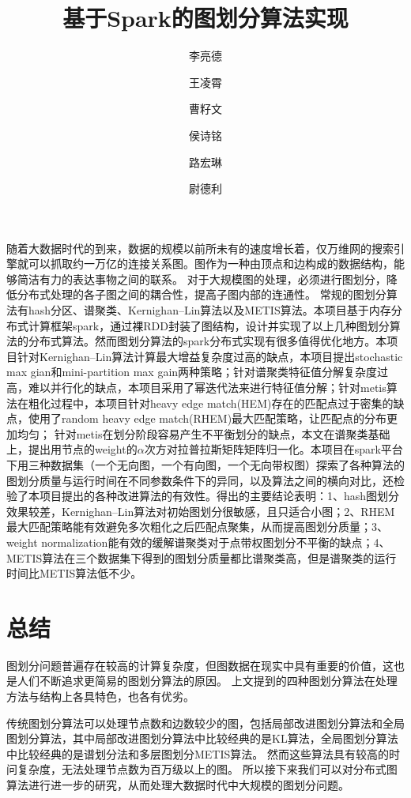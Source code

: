 \documentclass[UTF8,12pt]{ctexart} %
\theoremstyle{definition}
\begin{document}
\title{基于Spark的图划分算法实现}
\author[1]{李亮德}
\author[1]{王凌霄}
\author[2]{曹籽文}
\author[2]{侯诗铭}
\author[2]{路宏琳}
\author[3]{尉德利}
\renewcommand\Authands{, }

\maketitle

\renewcommand{\abstractname}{}
\begin{onecolabstract}
    随着大数据时代的到来，数据的规模以前所未有的速度增长着，仅万维网的搜索引擎就可以抓取约一万亿的连接关系图。图作为一种由顶点和边构成的数据结构，能够简洁有力的表达事物之间的联系。
    对于大规模图的处理，必须进行图划分，降低分布式处理的各子图之间的耦合性，提高子图内部的连通性。
    常规的图划分算法有hash分区、谱聚类、Kernighan–Lin算法以及METIS算法。本项目基于内存分布式计算框架spark，通过裸RDD封装了图结构，设计并实现了以上几种图划分算法的分布式算法。然而图划分算法的spark分布式实现有很多值得优化地方。本项目针对Kernighan–Lin算法计算最大增益复杂度过高的缺点，本项目提出stochastic max gian和mini-partition max gain两种策略；针对谱聚类特征值分解复杂度过高，难以并行化的缺点，本项目采用了幂迭代法来进行特征值分解；针对metis算法在粗化过程中，本项目针对heavy edge match(HEM)存在的匹配点过于密集的缺点，使用了random heavy edge match(RHEM)最大匹配策略，让匹配点的分布更加均匀；
    针对metis在划分阶段容易产生不平衡划分的缺点，本文在谱聚类基础上，提出用节点的weight的$\alpha$次方对拉普拉斯矩阵矩阵归一化。本项目在spark平台下用三种数据集（一个无向图，一个有向图，一个无向带权图）探索了各种算法的图划分质量与运行时间在不同参数条件下的异同，以及算法之间的横向对比，还检验了本项目提出的各种改进算法的有效性。得出的主要结论表明：1、hash图划分效果较差，Kernighan–Lin算法对初始图划分很敏感，且只适合小图；2、RHEM最大匹配策略能有效避免多次粗化之后匹配点聚集，从而提高图划分质量；3、weight normalization能有效的缓解谱聚类对于点带权图划分不平衡的缺点；4、METIS算法在三个数据集下得到的图划分质量都比谱聚类高，但是谱聚类的运行时间比METIS算法低不少。
\end{onecolabstract}

\newpage
\tableofcontents
\newpage






\section{总结}

图划分问题普遍存在较高的计算复杂度，但图数据在现实中具有重要的价值，这也是人们不断追求更简易的图划分算法的原因。
上文提到的四种图划分算法在处理方法与结构上各具特色，也各有优劣。

传统图划分算法可以处理节点数和边数较少的图，包括局部改进图划分算法和全局图划分算法，其中局部改进图划分算法中比较经典的是KL算法，全局图划分算法中比较经典的是谱划分法和多层图划分METIS算法。
然而这些算法具有较高的时问复杂度，无法处理节点数为百万级以上的图。
所以接下来我们可以对分布式图算法进行进一步的研究，从而处理大数据时代中大规模的图划分问题。
\end{document}
